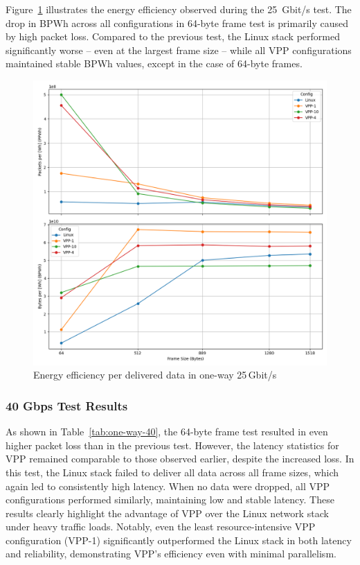 Figure~\ref{fig:25g} illustrates the energy efficiency observed during the 25~Gbit/s test.
The drop in BPWh across all configurations in 64-byte frame test is primarily caused by high packet loss.
Compared to the previous test, the Linux stack performed significantly worse -- even at the largest frame size -- while all VPP configurations maintained stable BPWh values, 
except in the case of 64-byte frames.

\begin{figure}[!htbp]
    \centering
    \includegraphics[width=\linewidth]{images/consumption-25g.png}
    \caption{Energy efficiency per delivered data in one-way 25\,Gbit/s}
    \label{fig:25g}
\end{figure}


\subsubsection{40 Gbps Test Results}

As shown in Table~\ref{tab:one-way-40}, the 64-byte frame test resulted in even higher packet loss than in the previous test.
However, the latency statistics for VPP remained comparable to those observed earlier, despite the increased loss.
In this test, the Linux stack failed to deliver all data across all frame sizes, which again led to consistently high latency.
When no data were dropped, all VPP configurations performed similarly, maintaining low and stable latency.
These results clearly highlight the advantage of VPP over the Linux network stack under heavy traffic loads.
Notably, even the least resource-intensive VPP configuration (VPP-1) significantly outperformed the Linux stack in both latency and reliability, 
demonstrating VPP’s efficiency even with minimal parallelism.

